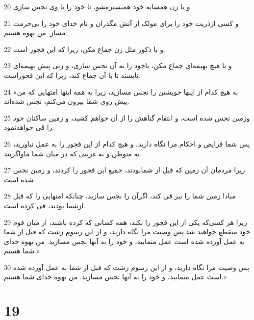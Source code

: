 \par 20 و با زن همسایه خود همبسترمشو، تا خود را با وی نجس سازی.
\par 21 و کسی ازذریت خود را برای مولک از آتش مگذران و نام خدای خود را بی‌حرمت مساز. من یهوه هستم.
\par 22 و با ذکور مثل زن جماع مکن، زیرا که این فجور است.
\par 23 و با هیچ بهیمه‌ای جماع مکن، تاخود را به آن نجس سازی، و زنی پیش بهیمه‌ای نایستد تا با آن جماع کند، زیرا که این فجوراست.
\par 24 «به هیچ کدام از اینها خویشتن را نجس مسازید، زیرا به همه اینها امتهایی که من پیش روی شما بیرون می‌کنم، نجس شده‌اند.
\par 25 وزمین نجس شده است، و انتقام گناهش را از آن خواهم کشید، و زمین ساکنان خود را قی خواهدنمود.
\par 26 پس شما فرایض و احکام مرا نگاه دارید، و هیچ کدام از این فجور را به عمل نیاورید، نه متوطن و نه غریبی که در میان شما ماواگزیند.
\par 27 زیرا مردمان آن زمین که قبل از شمابودند، جمیع این فجور را کردند، و زمین نجس شده است.
\par 28 مبادا زمین شما را نیز قی کند، اگرآن را نجس سازید، چنانکه امتهایی را که قبل ازشما بودند، قی کرده است.
\par 29 زیرا هر کسی‌که یکی از این فجور را بکند، همه کسانی که کرده باشند، از میان قوم خود منقطع خواهند شد.پس وصیت مرا نگاه دارید، و از این رسوم زشت که قبل از شما به عمل آورده شده است عمل منمایید، و خود را به آنها نجس مسازید. من یهوه خدای شما هستم.»
\par 30 پس وصیت مرا نگاه دارید، و از این رسوم زشت که قبل از شما به عمل آورده شده است عمل منمایید، و خود را به آنها نجس مسازید. من یهوه خدای شما هستم.»
 
\chapter{19}


